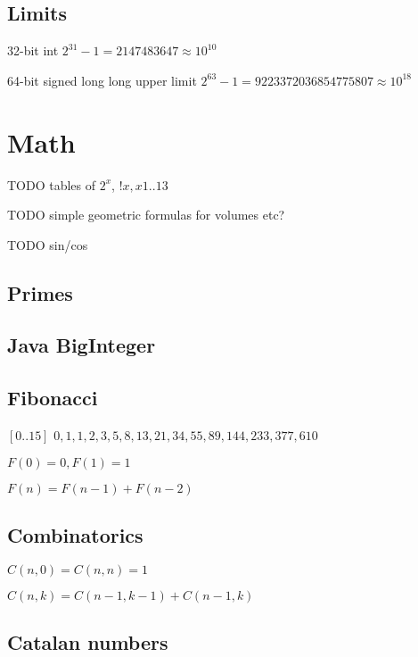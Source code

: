 \documentclass[twocolumn,8pt]{article}
\begin{document}
\subsection{Limits}

32-bit int $2^{31} - 1 = 2147483647 \approx 10^{10}$

64-bit signed long long upper limit $2^{63} - 1 = 9223372036854775807 \approx 10^{18}$


\section{Math}

TODO tables of $2^x$, $!x, x 1..13$

TODO simple geometric formulas for volumes etc?

TODO sin/cos



\subsection{Primes}



\subsection{Java BigInteger}





\subsection{Fibonacci}

$[0..15]$ $0, 1, 1, 2, 3, 5, 8, 13, 21, 34, 55, 89, 144, 233, 377, 610$

$F(0) = 0, F(1) = 1$

$F(n) = F(n - 1) + F(n - 2)$

\subsection{Combinatorics}

$C(n,0) = C(n,n) = 1$

$C(n,k) = C(n - 1, k - 1) + C(n - 1, k)$

\subsection{Catalan numbers}
\end{document}
